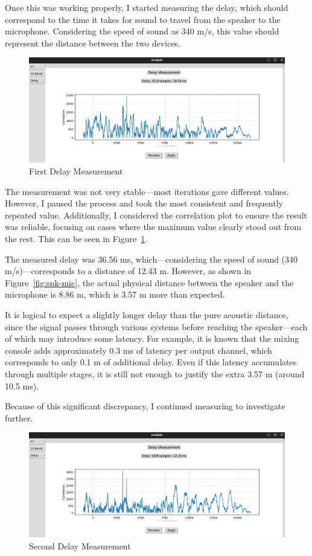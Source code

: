 Once this was working properly, I started measuring the delay, which should correspond to the time it takes for sound to travel from the speaker to the microphone. Considering the speed of sound as 340 m/s, this value should represent the distance between the two devices.

\begin{figure}[H]
	\centering
	\includegraphics[width=0.8
	\linewidth]{Figures/Coro_Delay.png}
	\caption{First Delay Measurement}
	\label{fig:Coro_delay1}
\end{figure}

The measurement was not very stable—most iterations gave different values. However, I paused the process and took the most consistent and frequently repeated value. Additionally, I considered the correlation plot to ensure the result was reliable, focusing on cases where the maximum value clearly stood out from the rest. This can be seen in Figure~\ref{fig:Coro_delay1}. 

The measured delay was 36.56 ms, which—considering the speed of sound (340 m/s)—corresponds to a distance of 12.43 m. However, as shown in Figure~\ref{fig:spk-mic}, the actual physical distance between the speaker and the microphone is 8.86 m, which is 3.57 m more than expected.

It is logical to expect a slightly longer delay than the pure acoustic distance, since the signal passes through various systems before reaching the speaker—each of which may introduce some latency. For example, it is known that the mixing console adds approximately 0.3 ms of latency per output channel, which corresponds to only 0.1 m of additional delay. Even if this latency accumulates through multiple stages, it is still not enough to justify the extra 3.57 m (around 10.5 ms).

Because of this significant discrepancy, I continued measuring to investigate further.

\begin{figure}[H]
	\centering
	\includegraphics[width=0.8
	\linewidth]{Figures/Coro_delay_2.png}
	\caption{Second Delay Measurement}
	\label{fig:Coro_delay2}
\end{figure}

